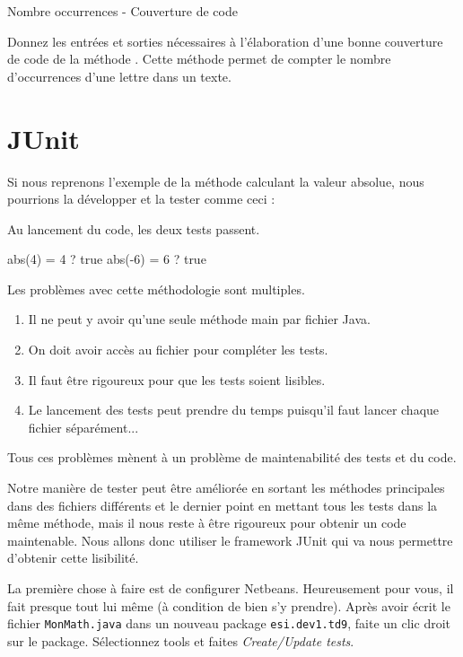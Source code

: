 \documentclass[a4paper,11pt]{style-esi/td}
\begin{document}
	\begin{Exercice}{Nombre occurrences - Couverture de code}
		
		Donnez les entrées et sorties nécessaires à l’élaboration d’une bonne couverture de code de la méthode . Cette méthode permet de compter le nombre d'occurrences d’une lettre dans un texte.
	\end{Exercice}

\section{JUnit}

	Si nous reprenons l’exemple de la méthode calculant la valeur absolue, nous pourrions la développer et la tester comme ceci :

	Au lancement du code, les deux tests passent.
	\begin{Console}
		abs(4) = 4 ? true
		abs(-6) = 6 ? true
	\end{Console}

	Les problèmes avec cette méthodologie sont multiples.
	\begin{enumerate}
		\item Il ne peut y avoir qu’une seule méthode main par fichier Java.
 		\item On doit avoir accès au fichier pour compléter les tests.
 		\item Il faut être rigoureux pour que les tests soient lisibles.
 		\item Le lancement des tests peut prendre du temps puisqu'il faut lancer chaque fichier séparément...
	\end{enumerate}
	Tous ces problèmes mènent à un problème de maintenabilité des tests et du code.

	Notre manière de tester peut être améliorée en sortant les méthodes principales dans des fichiers différents et le dernier point en mettant tous les tests dans la même méthode, mais il nous reste à être rigoureux pour obtenir un code maintenable. Nous allons donc utiliser le framework JUnit qui va nous permettre d'obtenir cette lisibilité.

	La première chose à faire est de configurer Netbeans. Heureusement pour
	vous, il fait presque tout lui même (à condition de bien s’y prendre).
	Après avoir écrit le fichier \texttt{MonMath.java} dans un nouveau package
	\texttt{esi.dev1.td9}, faite un clic droit sur le package. Sélectionnez
	tools et faites \textit{Create/Update tests}.
\end{document}
